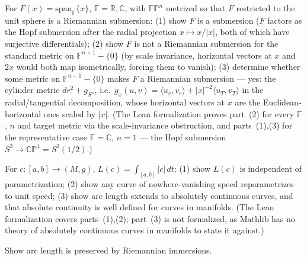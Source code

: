 \begin{remark}
  \label{rem:pet-ch1-ex-15}
  \leanok
  For $F(x)=\mathrm{span}_{\mathbb{F}}\{x\}$, $\mathbb{F}=\mathbb{R},\mathbb{C}$, with $\mathbb{FP}^n$ metrized so
  that $F$ restricted to the unit sphere is a Riemannian submersion: (1) show $F$
  is a submersion ($F$ factors as the Hopf submersion after the radial
  projection $x\mapsto x/|x|$, both of which have surjective differentials);
  (2) show $F$ is not a Riemannian submersion for the standard
  metric on $\mathbb{F}^{n+1}-\{0\}$ (by scale invariance, horizontal vectors at $x$
  and $2x$ would both map isometrically, forcing them to vanish); (3) determine
  whether some metric on $\mathbb{F}^{n+1}-\{0\}$ makes $F$ a Riemannian submersion —
  yes: the cylinder metric $dr^2+g_{S^n}$, i.e.\ $g_x(u,v)=\langle u_r,v_r\rangle
  +|x|^{-2}\langle u_T,v_T\rangle$ in the radial/tangential decomposition, whose
  horizontal vectors at $x$ are the Euclidean-horizontal ones scaled by $|x|$.
  (The Lean formalization proves part~(2) for every $\mathbb{F}$, $n$ and target
  metric via the scale-invariance obstruction, and parts~(1),(3) for the
  representative case $\mathbb{F}=\mathbb{C}$, $n=1$ — the Hopf submersion
  $S^3\to\mathbb{CP}^1=S^2(1/2)$.)
\end{remark}

\begin{remark}
  \label{rem:pet-ch1-ex-16}
  \leanok
  For $c:[a,b]\to(M,g)$, $L(c)=\int_{[a,b]}|\dot c|\,dt$: (1) show $L(c)$ is
  independent of parametrization; (2) show any curve of nowhere-vanishing speed
  reparametrizes to unit speed; (3) show arc length extends to absolutely
  continuous curves, and that absolute continuity is well defined for curves in
  manifolds.
  (The Lean formalization covers parts~(1),(2); part~(3) is not formalized, as
  Mathlib has no theory of absolutely continuous curves in manifolds to state it
  against.)
\end{remark}

\begin{remark}
  \label{rem:pet-ch1-ex-17}
  \leanok
  Show arc length is preserved by Riemannian immersions.
\end{remark}

